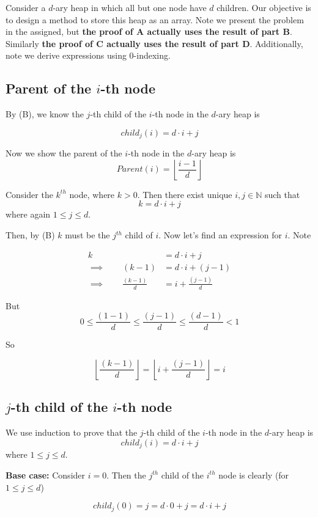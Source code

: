\documentclass[paper=a4, fontsize=11pt]{scrartcl} %
\numberwithin{equation}{section} %
\numberwithin{figure}{section} %
\numberwithin{table}{section} %
\begin{document}
Consider a $d$-ary heap in which all but one node have $d$ children. Our objective is to design a method to store this heap as an array. Note we present the problem in the assigned, but \textbf{the proof of A actually uses the result of part B}. Similarly \textbf{the proof of C actually uses the result of part D}. Additionally, note we derive expressions using 0-indexing. 

\subsection{Parent of the $i$-th node}

By (B), we know the $j$-th child of the $i$-th node in the $d$-ary heap is

\[child_j(i) = d\cdot i + j\]

Now we show the parent of the $i$-th node in the $d$-ary heap is
\[Parent(i) = \left\lfloor \frac{i-1}{d}\right\rfloor\]

Consider the $k^{th}$ node, where $k > 0$. Then there exist unique $i, j \in \mathbb{N}$ such that
\[k = d\cdot i + j\]
where again $1 \leq j \leq d$.

Then, by (B) $k$ must be the $j^{th}$ child of $i$. Now let's find an expression for $i$. Note

\begin{align*}
k &= d\cdot i + j \\
\implies \qquad{} (k -1) &= d \cdot i + (j - 1) \\
\implies \qquad{} \frac{(k -1)}{d} &= i + \frac{(j - 1)}{d}
\end{align*}

But
\[0 \leq \frac{(1 - 1)}{d} \leq \frac{(j - 1)}{d} \leq \frac{(d - 1)}{d} < 1\]

So

\[\left\lfloor \frac{(k-1)}{d} \right\rfloor = \left\lfloor i + \frac{(j-1)}{d} \right\rfloor = i \]

\subsection{$j$-th child of the $i$-th node}

We use induction to prove that the $j$-th child of the $i$-th node in the $d$-ary heap is
\[child_j(i) = d\cdot i + j\]
where $1 \leq j \leq d$.

\textbf{Base case:} Consider $i = 0$. Then the $j^{th}$ child of the $i^{th}$ node is clearly (for $1 \leq j \leq d$)

\[child_j(0) = j = d \cdot 0 + j = d \cdot i + j\]
\end{document}
